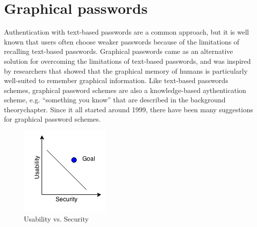   \clearpage
  \section{Graphical passwords}



    Authentication with text-based passwords are a common approach, but it is well known that users often choose weaker passwords because of the limitations of recalling text-based passwords. Graphical passwords came as an alternative solution for overcoming the limitations of text-based passwords, and was inspired by researchers that showed that the graphical memory of humans is particularly well-suited to remember graphical information. 
    Like text-based passwords schemes, graphical password schemes are also a knowledge-based aythentication scheme, e.g. ``something you know'' that are described in the background theorychapter. Since it all started around 1999, there have been many suggestions for graphical password schemes. 

       \begin{figure}
      \vspace{-20pt}
      \begin{center}
        \includegraphics[scale=0.7]{pics/UsabilityVsSecurity.png}
      \end{center}
      \vspace{-20pt}
      \caption{Usability vs. Security}
      \vspace{-10pt}
    \end{figure}

